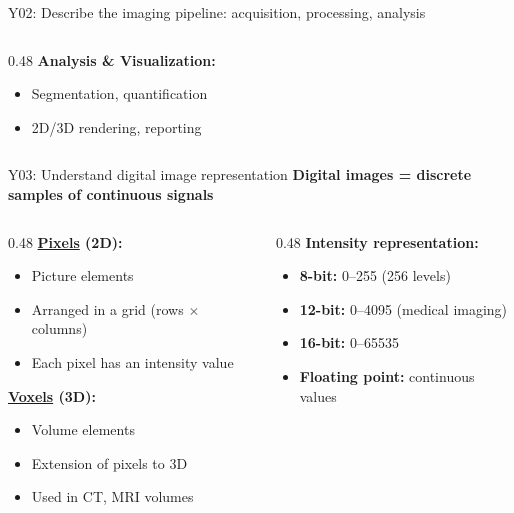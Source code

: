 \documentclass[aspectratio=169, 10pt]{beamer}
\begin{document}
\begin{frame}{Y02: Describe the imaging pipeline: acquisition, processing, analysis}
\begin{columns}[T]
\begin{column}{0.48\textwidth}
            \textbf{Analysis \& Visualization:}
            \begin{itemize}
                \item Segmentation, quantification
                \item 2D/3D rendering, reporting
            \end{itemize}
        \end{column}
    \end{columns}
\end{frame}

\begin{frame}{Y03: Understand digital image representation}
    \textbf{Digital images = discrete samples of continuous signals}
    
    \vspace{0.2cm}
    \begin{columns}[T]
        \begin{column}{0.48\textwidth}
            \textbf{\href{https://en.wikipedia.org/wiki/Pixel}{Pixels} (2D):}
            \begin{itemize}
                \item Picture elements
                \item Arranged in a grid (rows $\times$ columns)
                \item Each pixel has an intensity value
            \end{itemize}
            
            \vspace{0.2cm}
            \textbf{\href{https://en.wikipedia.org/wiki/Voxel}{Voxels} (3D):}
            \begin{itemize}
                \item Volume elements
                \item Extension of pixels to 3D
                \item Used in CT, MRI volumes
            \end{itemize}
        \end{column}
        \begin{column}{0.48\textwidth}
            \textbf{Intensity representation:}
            \begin{itemize}
                \item \textbf{8-bit:} 0--255 (256 levels)
                \item \textbf{12-bit:} 0--4095 (medical imaging)
                \item \textbf{16-bit:} 0--65535
                \item \textbf{Floating point:} continuous values
            \end{itemize}
            

\end{column}
\end{columns}
\end{frame}
\end{document}
